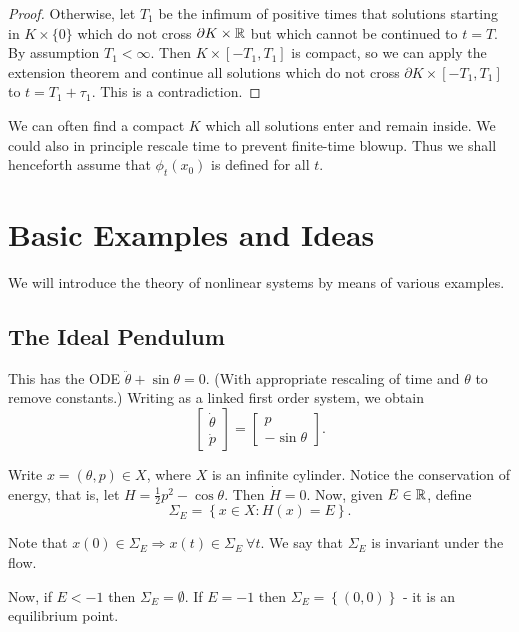 \documentclass{notes}
\theoremstyle{plain}
\begin{document}
\begin{proof}
  Otherwise, let $T_1$ be the infimum of positive times that solutions
  starting in $K \times \{ 0 \}$ which do not cross $\partial K \times
  \mathbb{R}$ but which cannot be continued to $t = T$.  By assumption $T_1 <
  \infty$.  Then $K \times [ -T_1, T_1]$ is compact, so we can apply
  the extension theorem and continue all solutions which do not cross
  $\partial K \times [-T_1, T_1]$ to $t = T_1 + \tau_1$.  This is a
  contradiction.
\end{proof}

We can often find a compact $K$ which all solutions enter and remain
inside.  We could also in principle rescale time to prevent
finite-time blowup.  Thus we shall henceforth assume that
$\phi_t(x_0)$ is defined for all $t$.

\chapter{Basic Examples and Ideas}

We will introduce the theory of nonlinear systems by means of various
examples.

\section{The Ideal Pendulum}

This has the ODE $\ddot{\theta} + \sin \theta = 0$.  (With appropriate
rescaling of time and $\theta$ to remove constants.)  Writing as a
linked first order system, we obtain
\[
\left[
\begin{matrix}
  \dot{\theta} \\ \dot{p}
\end{matrix}
\right] = \left[
\begin{matrix}
  p \\ - \sin \theta
\end{matrix}
\right].
\]

Write $x = (\theta,p) \in X$, where $X$ is an infinite cylinder.
Notice the conservation of energy, that is, let $H = \tfrac{1}{2} p^2
- \cos \theta$.  Then $\dot{H} = 0$.  Now, given $E \in \mathbb{R}$, define
\[
\Sigma_E = \left\{ x \in X : H(x) = E\right\}.
\]

Note that $x(0) \in \Sigma_E \Rightarrow x(t) \in \Sigma_E\ \forall
t$.  We say that $\Sigma_E$ is invariant under the flow.

Now, if $E < -1$ then $\Sigma_E = \emptyset$.  If $E = -1$ then
$\Sigma_E = \left\{ \left( 0,0 \right) \right\}$ - it is an
equilibrium point.
\end{document}
